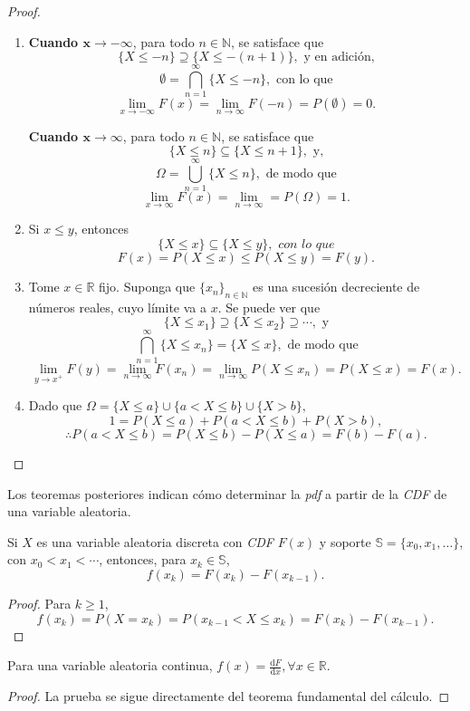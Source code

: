 	\begin{proof}

	\begin{enumerate}
		
		\item \textbf{Cuando $\mathbf{x\rightarrow-\infty}$}, para todo $n\in\mathbb{N}$, se satisface que
		$$\{X\leq -n\} \supseteq \{X\leq -(n+1)\}, \text{ y en adición,}$$
		$$\emptyset = \bigcap_{n=1}^\infty \{ X\leq -n\}, \text{ con lo que}$$
		$$\lim_{x\rightarrow-\infty}F(x)=\lim_{n\rightarrow \infty}F(-n)=P(\emptyset)=0.$$
		
		\textbf{Cuando $\mathbf{x\rightarrow\infty}$}, para todo $n\in\mathbb{N}$, se satisface que
		$$\{X\leq n\}\subseteq\{ X\leq n+1\}, \text{ y,}$$
		$$\Omega=\bigcup_{n=1}^\infty \{ X\leq n\}, \text{ de modo que}$$
		$$\lim_{x\rightarrow\infty} F(x)=\lim_{n\rightarrow\infty}=P(\Omega)=1.$$
		
		\item Si $x\leq y$, entonces
		$$\{X\leq x\}\subseteq \{X\leq y\}, \textit{ con lo que}$$
		$$F(x)=P(X\leq x)\leq P(X\leq y)=F(y).$$
		
		\item Tome $x\in\mathbb{R}$ fijo. Suponga que $\{x_n\}_{n\in\mathbb{N}}$ es una sucesión decreciente de números reales, cuyo límite va a $x$. Se puede ver que
		$$\{X\leq x_1\}\supseteq\{X\leq x_2\}\supseteq\cdots, \text{ y}$$
		$$\bigcap_{n=1}^\infty \{X\leq x_n\}=\{ X\leq x\}, \text{ de modo que}$$
		$$\lim_{y\rightarrow x^+} F(y)=\lim_{n\rightarrow \infty} F(x_n)=\lim_{n\rightarrow\infty} P(X\leq x_n)=P(X\leq x)=F(x).$$
		
		\item Dado que $\Omega=\{X\leq a\}\cup\{a<X\leq b\}\cup \{X>b\},$
		$$1=P(X\leq a)+P(a<X\leq b)+P(X>b),$$
		$$\therefore P(a<X\leq b)=P(X\leq b)-P(X\leq a)=F(b)-F(a).$$
	\end{enumerate}
		
	\end{proof}
	
	Los teoremas posteriores indican cómo determinar la \textit{pdf} a partir de la \textit{CDF} de una variable aleatoria.
	\begin{theo}
		Si $X$ es una variable aleatoria discreta con \textit{CDF} $F(x)$ y soporte $\mathbb{S}=\{x_0,x_1,\dots\}$, con $x_0<x_1<\cdots$, entonces, para $x_k\in\mathbb{S}$,
		$$f(x_k)=F(x_k)-F(x_{k-1}).$$
	\end{theo}
	\begin{proof}
		Para $k\geq 1$,
		$$f(x_k)=P(X=x_k)=P(x_{k-1}<X\leq x_k)=F(x_k)-F(x_{k-1}).$$
	\end{proof}
	\begin{theo}
		Para una variable aleatoria continua, $f(x)=\frac{\mathrm{d}F}{\mathrm{d}x}, \forall x\in\mathbb{R}.$
	\end{theo}
	\begin{proof}
		La prueba se sigue directamente del teorema fundamental del cálculo.
	\end{proof}
